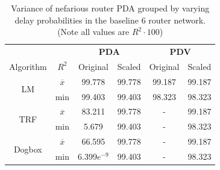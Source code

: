 \begin{table}[H]
 \centering
  \begin{tabular}{@{}cccccc@{}}
   \toprule
    &&\multicolumn{2}{c}{\textbf{PDA}} & \multicolumn{2}{c}{\textbf{PDV}} \\
    \cmidrule(rl){3-4} \cmidrule(rl){5-6}
    Algorithm & $R^2$ & Original & Scaled & Original & Scaled \\
    \midrule
    \multirow{2}{*}{LM}     & $\overline{x}$ & 99.778        & 99.778 & 99.187 & 99.187 \\
                            & min            & 99.403        & 99.403 & 98.323 & 98.323 \\
    \multirow{2}{*}{TRF}    & $\overline{x}$ & 83.211        & 99.778 & -      & 99.187 \\
                            & min            & 5.679         & 99.403 & -      & 98.323 \\
    \multirow{2}{*}{Dogbox} & $\overline{x}$ & 66.595        & 99.778 & -      & 99.187 \\
                            & min            & 6.399$e^{-9}$ & 99.403 & -      & 98.323 \\
   \bottomrule
  \end{tabular}
  \caption{Variance of nefarious router PDA grouped by varying delay probabilities in the baseline 6 router network. (Note all values are $R^2\cdot 100$)}
  \end{table}
    
